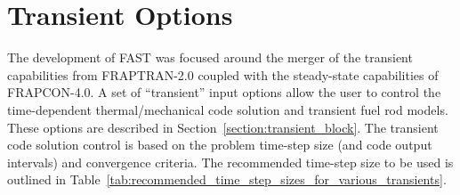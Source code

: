 \section{Transient Options}\label{section:transient-options}

The development of FAST was focused around the merger of the transient capabilities from
FRAPTRAN-2.0 coupled with the steady-state capabilities of FRAPCON-4.0. A set of ``transient'' input
options allow the user to control the time-dependent thermal/mechanical code solution and transient
fuel rod models. These options are described in Section~\ref{section:transient_block}. The transient
code solution control is based on the problem time-step size (and code output intervals) and
convergence criteria. The recommended time-step size to be used is outlined in
Table~\ref{tab:recommended_time_step_sizes_for_various_transients}.

